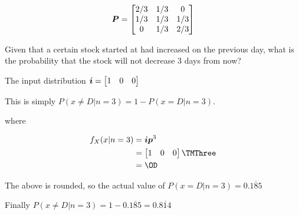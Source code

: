 \documentclass[12pt]{article}
\begin{document}
$$\bm{P}=\begin{bmatrix} 2/3 & 1/3 & 0 \\ 1/3 & 1/3 & 1/3 \\ 0 & 1/3 & 2/3 \end{bmatrix}$$


Given that a certain stock started at had increased on the previous day, what is the 
probability that the stock will not decrease 3 days from now?

The input distribution $\bm{i}=\begin{bmatrix} 1 & 0 & 0 \\ \end{bmatrix}$

This is simply $P(x\neq D|n=3) = 1-P(x= D|n=3)$.

where 

\begin{align*}
  f_X(x|n=3)&=\bm i \bm p^3\\
                &=\ID\TMThree\\
                &=\OD
\end{align*}

The above is rounded, so the actual value of $P(x=D|n=3)=0.\overline{ 185}$

Finally $P(x\neq D | n=3)=1-0.\overline{185}=0.\overline{814}$
\end{document}
